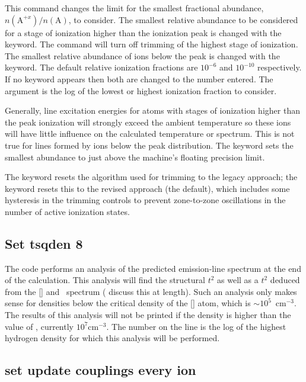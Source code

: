 This command changes the limit for the smallest fractional abundance,
$n(\mathrm{A}^{+x})/n(\mathrm{A})$, to consider.
The smallest relative abundance to be considered
for a stage of ionization higher than the ionization peak is changed with
the  keyword.
The command  will turn off trimming
of the highest stage of ionization.
The smallest relative abundance of
ions below the peak is changed with the  keyword.
The default relative
ionization fractions are $10^{-6}$ and $10^{-10}$ respectively.
If no keyword appears
then both are changed to the number entered.
The argument is the log of
the lowest or highest ionization fraction to consider.

Generally, line excitation energies for atoms with
stages of ionization higher than the peak ionization will
strongly exceed the ambient temperature
so these ions will have little influence on the calculated
temperature or spectrum.
This is not true for lines formed by ions below the peak
distribution.
The keyword  sets the smallest abundance to just above
the machine's floating precision limit.

The keyword  resets the algorithm used for trimming to
the legacy approach; the keyword  resets this to the
revised approach (the default), which includes some hysteresis in the
trimming controls to prevent zone-to-zone oscillations in the number
of active ionization states.

\subsection{Set tsqden 8}

The code performs an analysis of the predicted emission-line spectrum
at the end of the calculation.
This analysis will find the structural $t^2$
as well as a $t^2$ deduced from the [\oiii] and \hi\ spectrum
(\citealp{KingdonFerland1995} discuss this at length).
Such an analysis only makes sense for
densities below the critical density of the [\oiii] atom,
which is $\sim 10^5$~cm$^{-3}$.
The results of this analysis will not be printed if the density is
higher than the value of , currently $10^7 \mathrm{cm}^{-3}$.
The number on the
line is the log of the highest hydrogen density for which this analysis
will be performed.

\subsection{set update couplings every ion}

